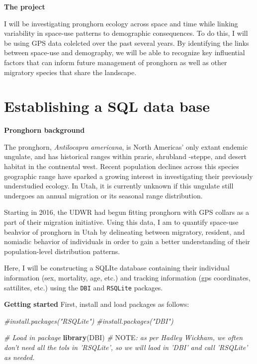 \documentclass[]{book}
\newenvironment{Shaded}{\begin{snugshade}}{\end{snugshade}}
\newcommand{\KeywordTok}[1]{\textcolor[rgb]{0.13,0.29,0.53}{\textbf{#1}}}
\newcommand{\CommentTok}[1]{\textcolor[rgb]{0.56,0.35,0.01}{\textit{#1}}}
\newcommand{\AlertTok}[1]{\textcolor[rgb]{0.94,0.16,0.16}{#1}}
\newcommand{\NormalTok}[1]{#1}
\begin{document}
\textbf{The project}

I will be investigating pronghorn ecology across space and time while
linking variability in space-use patterns to demographic consequences.
To do this, I will be using GPS data colelcted over the past several
years. By identifying the links between space-use and demography, we
will be able to recognize key influential factors that can inform future
management of pronghorn as well as other migratory species that share
the landscape.

\chapter{Establishing a SQL data base}\label{Ch}

\textbf{Pronghorn background}

The pronghorn, \emph{Antilocapra americana}, is North Americas' only
extant endemic ungulate, and has historical ranges within prarie,
shrubland -steppe, and desert habitat in the contnental west. Recent
population declines across this species geographic range have sparked a
growing interest in investigating their previously understudied ecology.
In Utah, it is currently unknown if this ungulate still undergoes an
annual migration or its seasonal range distribution.

Starting in 2016, the UDWR had begun fitting pronghorn with GPS collars
as a part of their migration initiative. Using this data, I am to
quantify space-use beahvior of pronghorn in Utah by delineating between
migratory, resident, and nomiadic behavior of individuals in order to
gain a better understanding of their population-level distribution
patterns.

Here, I will be constructing a SQLIte database containing their
individual information (sex, mortality, age, etc.) and tracking
information (gps coordinates, sattilites, etc.) using the \texttt{DBI}
and \texttt{RSQLite} packages.

\textbf{Getting started} First, install and load packages as follows:

\begin{Shaded}
\begin{Highlighting}[]
\CommentTok{#install.packages("RSQLite")}
\CommentTok{#install.packages("DBI")}

\CommentTok{# Load in package}
\KeywordTok{library}\NormalTok{(DBI)}
\CommentTok{# }\AlertTok{NOTE}\CommentTok{: as per Hadley Wickham, we often don't need all the tols in 'RSQLite', so we will laod in 'DBI' and call 'RSQLite' as needed.}
\end{Highlighting}
\end{Shaded}
\end{document}
